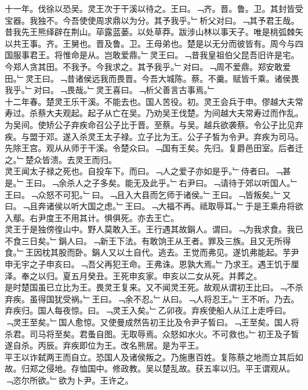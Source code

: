 \documentclass{zhvt-classic}
\begin{document}
\hspace*{2em}十一年。伐徐以恐吴。灵王次于干溪以待之。王曰。﹁齐。晋。鲁。卫。其封皆受宝器。我独不。今吾使使周求鼎以为分。其予我乎。﹂析父对曰。﹁其予君王哉。昔我先王熊绎辟在荆山。荜露蓝蒌。以处草莽。跋涉山林以事天子。唯是桃弧棘矢以共王事。齐。王舅也。晋及鲁。卫。王母弟也。楚是以无分而彼皆有。周今与四国服事君王。将惟命是从。岂敢爱鼎。﹂灵王曰。﹁昔我皇祖伯父昆吾旧许是宅。今郑人贪其田。不我予。今我求之。其予我乎。﹂对曰。﹁周不爱鼎。郑安敢爱田。﹂灵王曰。﹁昔诸侯远我而畏晋。今吾大城陈。蔡。不羹。赋皆千乘。诸侯畏我乎。﹂对曰。﹁畏哉。﹂灵王喜曰。﹁析父善言古事焉。﹂\\
\hspace*{2em}十二年春。楚灵王乐干溪。不能去也。国人苦役。初。灵王会兵于申。僇越大夫常寿过。杀蔡大夫观起。起子从亡在吴。乃劝吴王伐楚。为间越大夫常寿过而作乱。为吴间。使矫公子弃疾命召公子比于晋。至蔡。与吴。越兵欲袭蔡。令公子比见弃疾。与盟于邓。遂入杀灵王太子禄。立子比为王。公子子皙为令尹。弃疾为司马。先除王宫。观从从师于干溪。令楚众曰。﹁国有王矣。先归。复爵邑田室。后者迁之。﹂楚众皆溃。去灵王而归。\\
\hspace*{2em}灵王闻太子禄之死也。自投车下。而曰。﹁人之爱子亦如是乎。﹂侍者曰。﹁甚是。﹂王曰。﹁余杀人之子多矣。能无及此乎。﹂右尹曰。﹁请待于郊以听国人。﹂王曰。﹁众怒不可犯。﹂曰。﹁且入大县而乞师于诸侯。﹂王曰。﹁皆叛矣。﹂又曰。﹁且奔诸侯以听大国之虑。﹂王曰。﹁大福不再。祗取辱耳。﹂于是王乘舟将欲入鄢。右尹度王不用其计。惧俱死。亦去王亡。\\
\hspace*{2em}灵王于是独傍徨山中。野人莫敢入王。王行遇其故鋗人。谓曰。﹁为我求食。我已不食三日矣。﹂鋗人曰。﹁新王下法。有敢饷王从王者。罪及三族。且又无所得食。﹂王因枕其股而卧。鋗人又以土自代。逃去。王觉而弗见。遂饥弗能起。芋尹申无宇之子申亥曰。﹁吾父再犯王命。王弗诛。恩孰大焉。﹂乃求王。遇王饥于厘泽。奉之以归。夏五月癸丑。王死申亥家。申亥以二女从死。并葬之。\\
\hspace*{2em}是时楚国虽已立比为王。畏灵王复来。又不闻灵王死。故观从谓初王比曰。﹁不杀弃疾。虽得国犹受祸。﹂王曰。﹁余不忍。﹂从曰。﹁人将忍王。﹂王不听。乃去。弃疾归。国人每夜惊。曰。﹁灵王入矣。﹂乙卯夜。弃疾使船人从江上走呼曰。﹁灵王至矣。﹂国人愈惊。又使曼成然告初王比及令尹子皙曰。﹁王至矣。国人将杀君。司马将至矣。君蚤自图。无取辱焉。众怒如水火。不可救也。﹂初王及子皙遂自杀。丙辰。弃疾即位为王。改名熊居。是为平王。\\
\hspace*{2em}平王以诈弑两王而自立。恐国人及诸侯叛之。乃施惠百姓。复陈蔡之地而立其后如故。归郑之侵地。存恤国中。修政教。吴以楚乱故。获五率以归。平王谓观从。﹁恣尔所欲。﹂欲为卜尹。王许之。\\
\end{document}

